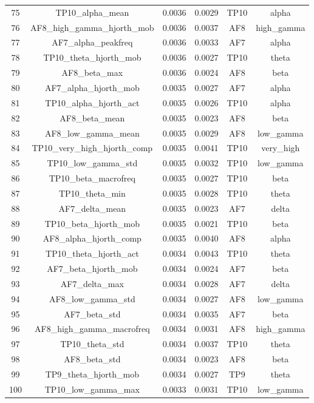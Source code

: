\begin{table}[hptb]
\begin{table}
\begin{tabular}{cccccc}
75 & TP10_alpha_mean & 0.0036 & 0.0029 & TP10 & alpha \\
76 & AF8_high_gamma_hjorth_mob & 0.0036 & 0.0037 & AF8 & high_gamma \\
77 & AF7_alpha_peakfreq & 0.0036 & 0.0033 & AF7 & alpha \\
78 & TP10_theta_hjorth_mob & 0.0036 & 0.0027 & TP10 & theta \\
79 & AF8_beta_max & 0.0036 & 0.0024 & AF8 & beta \\
80 & AF7_alpha_hjorth_mob & 0.0035 & 0.0027 & AF7 & alpha \\
81 & TP10_alpha_hjorth_act & 0.0035 & 0.0026 & TP10 & alpha \\
82 & AF8_beta_mean & 0.0035 & 0.0023 & AF8 & beta \\
83 & AF8_low_gamma_mean & 0.0035 & 0.0029 & AF8 & low_gamma \\
84 & TP10_very_high_hjorth_comp & 0.0035 & 0.0041 & TP10 & very_high \\
85 & TP10_low_gamma_std & 0.0035 & 0.0032 & TP10 & low_gamma \\
86 & TP10_beta_macrofreq & 0.0035 & 0.0027 & TP10 & beta \\
87 & TP10_theta_min & 0.0035 & 0.0028 & TP10 & theta \\
88 & AF7_delta_mean & 0.0035 & 0.0023 & AF7 & delta \\
89 & TP10_beta_hjorth_mob & 0.0035 & 0.0021 & TP10 & beta \\
90 & AF8_alpha_hjorth_comp & 0.0035 & 0.0040 & AF8 & alpha \\
91 & TP10_theta_hjorth_act & 0.0034 & 0.0043 & TP10 & theta \\
92 & AF7_beta_hjorth_mob & 0.0034 & 0.0024 & AF7 & beta \\
93 & AF7_delta_max & 0.0034 & 0.0028 & AF7 & delta \\
94 & AF8_low_gamma_std & 0.0034 & 0.0027 & AF8 & low_gamma \\
95 & AF7_beta_std & 0.0034 & 0.0035 & AF7 & beta \\
96 & AF8_high_gamma_macrofreq & 0.0034 & 0.0031 & AF8 & high_gamma \\
97 & TP10_theta_std & 0.0034 & 0.0037 & TP10 & theta \\
98 & AF8_beta_std & 0.0034 & 0.0023 & AF8 & beta \\
99 & TP9_theta_hjorth_mob & 0.0034 & 0.0027 & TP9 & theta \\
100 & TP10_low_gamma_max & 0.0033 & 0.0031 & TP10 & low_gamma \\

\end{tabular}
\end{table}
\end{table}
